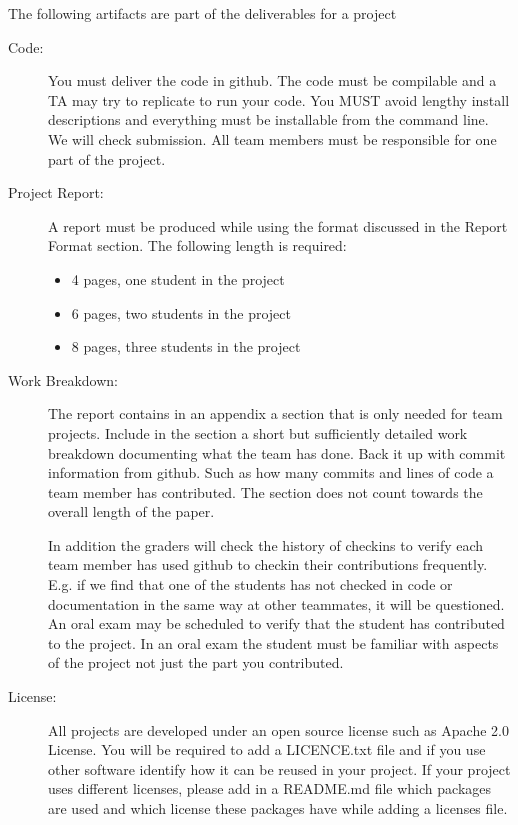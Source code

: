 The following artifacts are part of the deliverables for a project
\begin{description}
\item[{Code:}] \leavevmode
You must deliver the code in github. The code must be compilable
and a TA may try to replicate to run your code. You MUST avoid
lengthy install descriptions and everything must be installable
from the command line. We will check submission. All team members
must be responsible for one part of the project.

\item[{Project Report:}] \leavevmode
A report must be produced while using the format discussed in the
Report Format section. The following length is required:
\begin{itemize}
\item {} 
4 pages, one student in the project

\item {} 
6 pages, two students in the project

\item {} 
8 pages, three students in the project

\end{itemize}

\item[{Work Breakdown:}] \leavevmode
The report contains in an appendix a section that is
only needed for team projects. Include in the section a short but
sufficiently detailed work breakdown documenting what the team has
done. Back it up with commit information from github. Such as how
many commits and lines of code a team member has contributed. The
section does not count towards the overall length of the paper.

In addition the graders will check the history of checkins to
verify each team member has used github to checkin their
contributions frequently. E.g. if we find that one of the students
has not checked in code or documentation in the same way at other
teammates, it will be questioned. An oral exam may be scheduled to
verify that the student has contributed to the project. In an oral
exam the student must be familiar with  aspects of the
project not just the part you contributed.

\item[{License:}] \leavevmode
All projects are developed under an open source license such
as Apache 2.0 License. You will be required to add a LICENCE.txt
file and if you use other software identify how it can be reused
in your project. If your project uses different licenses, please
add in a README.md file which packages are used and which license
these packages have while adding a licenses file.


\end{description}
